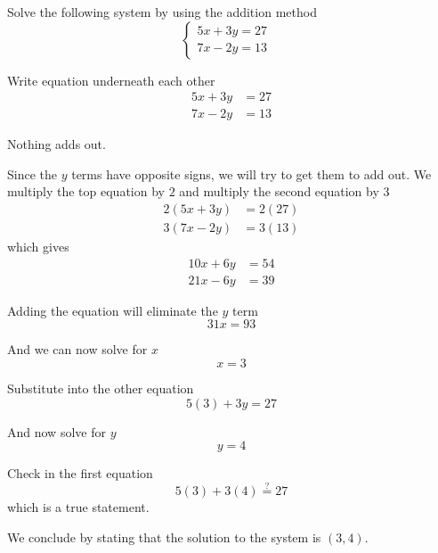 \begin{myexample}
Solve the following system by using the addition method
\[
\begin{cases}
		5x+3y  =27 &\\
		7x-2y  =13 &
      \end{cases}
\]
{}
\end{myexample}
\begin{myProof}
	\begin{steps}
		\item Write equation underneath each other
		\begin{align*}
			5x+3y & =27 \\
			7x-2y & =13 
		\end{align*} 
		\item Nothing adds out.
		\item Since the $y$ terms have opposite signs, we will 
		try to get them to add out. We multiply the top equation by $2$
		and multiply the second equation by $3$
		\begin{align*}
			2(5x+3y) & =2(27) \\
			3(7x-2y) & =3(13) 
		\end{align*} 
		which gives
		\begin{align*}
			10x+6y & = 54 \\ 
			21x-6y & = 39 
		\end{align*}
		\item Adding the equation will eliminate the $y$ term
		\[
			31x = 93
		\]
		\item And we can now solve for $x$
		\[
			x = 3
		\]
		\item Substitute into the other equation
		\[
			5(3)+3y = 27
		\]	
		\item And now solve for $y$
		\[
			y = 4
		\]
		\item Check in the first equation
		\[
			5(3)+3(4)\stackrel{?}{=} 27
		\]
		which is a true statement.
		\item We conclude by stating that the solution to the system is $(3,4)$.
	\end{steps} 
\end{myProof} 
																																																																										

